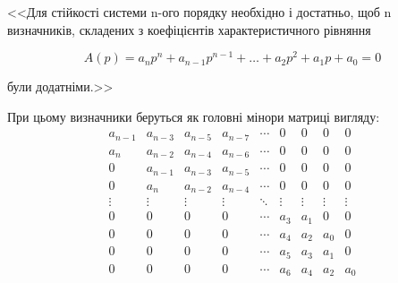<<Для стійкості системи n-ого порядку необхідно і достатньо, щоб n визначників, 
складених з коефіцієнтів характеристичного рівняння 

$$A(p) = a_n p^n + a_{n-1} p^{n-1} + \ldots + a_2 p^2 + a_1 p + a_0 = 0$$ 

були додатніми.>>

При цьому визначники беруться як головні мінори матриці вигляду:
\[
\begin{array}{ccccccccc}
a_{n-1} & a_{n-3} & a_{n-5} & a_{n-7} & \cdots & 0 & 0 & 0 & 0\\
a_{n} & a_{n-2} & a_{n-4} & a_{n-6} & \cdots & 0 & 0 & 0 & 0\\
0 & a_{n-1} & a_{n-3} & a_{n-5} & \cdots & 0 & 0 & 0 & 0\\
0 & a_{n} & a_{n-2} & a_{n-4} & \cdots & 0 & 0 & 0 & 0\\
\vdots & \vdots & \vdots & \vdots & \ddots & \vdots & \vdots & \vdots & \vdots\\
0 & 0 & 0 & 0 & \cdots & a_{3} & a_{1} & 0 & 0\\
0 & 0 & 0 & 0 & \cdots & a_{4} & a_{2} & a_{0} & 0\\
0 & 0 & 0 & 0 & \cdots & a_{5} & a_{3} & a_{1} & 0\\
0 & 0 & 0 & 0 & \cdots & a_{6} & a_{4} & a_{2} & a_{0}\end{array}\]

